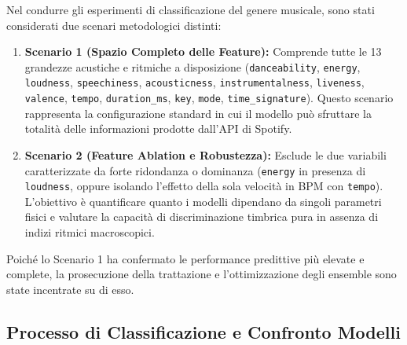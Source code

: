 \documentclass[12pt,a4paper]{article}
\begin{document}
Nel condurre gli esperimenti di classificazione del genere musicale, sono stati considerati due scenari metodologici distinti:
\begin{enumerate}
    \item \textbf{Scenario 1 (Spazio Completo delle Feature):} Comprende tutte le 13 grandezze acustiche e ritmiche a disposizione (\texttt{danceability}, \texttt{energy}, \texttt{loudness}, \texttt{speechiness}, \texttt{acousticness}, \texttt{instrumentalness}, \texttt{liveness}, \texttt{valence}, \texttt{tempo}, \texttt{duration\_ms}, \texttt{key}, \texttt{mode}, \texttt{time\_signature}). Questo scenario rappresenta la configurazione standard in cui il modello può sfruttare la totalità delle informazioni prodotte dall'API di Spotify.
    \item \textbf{Scenario 2 (Feature Ablation e Robustezza):} Esclude le due variabili caratterizzate da forte ridondanza o dominanza (\texttt{energy} in presenza di \texttt{loudness}, oppure isolando l'effetto della sola velocità in BPM con \texttt{tempo}). L'obiettivo è quantificare quanto i modelli dipendano da singoli parametri fisici e valutare la capacità di discriminazione timbrica pura in assenza di indizi ritmici macroscopici.
\end{enumerate}

Poiché lo Scenario 1 ha confermato le performance predittive più elevate e complete, la prosecuzione della trattazione e l'ottimizzazione degli ensemble sono state incentrate su di esso.

\subsection{Processo di Classificazione e Confronto Modelli}
\end{document}
